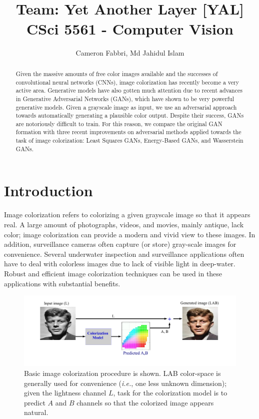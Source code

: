 \documentclass[10pt]{article}
\title{\textbf{\doctitle}\\
\small {Team: Yet Another Layer [YAL]} \\
\small CSci 5561 - Computer Vision }
\author{Cameron Fabbri, Md Jahidul Islam}
\date{}
\begin{document}
\maketitle

\begin{abstract}
Given the massive amounts of free color images available and the successes of convolutional neural networks (CNNs),
image colorization has recently become a very active area. Generative models have also gotten much attention due to
recent advances in Generative Adversarial Networks (GANs), which have shown to be very powerful generative models.
Given a grayscale image as input, we use an adversarial approach towards automatically generating a plausible color
output. Despite their success, GANs are notoriously difficult to train. For this reason, we compare the original GAN
formation with three recent improvements on adversarial methods applied towards the task of image colorization:
Least Squares GANs, Energy-Based GANs, and Wasserstein GANs.
\end{abstract}

\section{Introduction}\label{sec:intro}
Image colorization \cite{zhang2016colorful, cheng2015deep, bugeau2014variational} refers to colorizing a given grayscale image so that it appears real. 
A large amount of photographs, videos, and movies, mainly antique, lack color; image colorization can provide a modern and vivid view to these images. In addition, surveillance cameras often capture (or store) gray-scale images for convenience. Several underwater inspection and surveillance applications \cite{lu2013underwater, torres2005color} often have to deal with colorless images due to lack of visible light in deep-water. Robust and efficient image colorization techniques can be used in these applications with substantial benefits.   

\begin{figure}[h]
\vspace{-3mm}
\includegraphics[width=\linewidth]{Figs/6.pdf}
\vspace{-13mm}
\caption{Basic image colorization procedure is shown. LAB color-space is generally used for convenience (\textit{i.e.}, one less unknown dimension);
given the lightness channel $L$, task for the colorization model is to predict $A$ and $B$ channels so that the colorized image appears natural. }
\label{fig:col}
\end{figure}  
\end{document}
